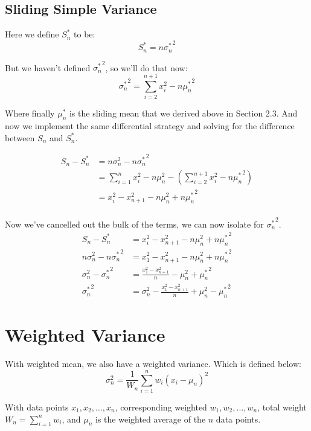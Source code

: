 \documentclass[english,12pt]{article}
\theoremstyle{plain}
\theoremstyle{definition}
\theoremstyle{definition} %
\newcommand{\brac}[1]{\left(#1\right)} %
\begin{document}
\subsection{Sliding Simple Variance}
Here we define $S_n^\ast$ to be:
\[S_n^\ast = n{\sigma_n^\ast}^2\]

But we haven't defined ${\sigma_n^\ast}^2$, so we'll do that now:
\[{\sigma_n^\ast}^2 = \sum_{i=2}^{n+1}x_i^2 - n{\mu_n^\ast}^2\]

Where finally $\mu_n^\ast$ is the sliding mean that we derived above in Section 2.3.  And now we implement  the same differential strategy and solving for the difference between $S_n$ and $S_n^\ast$.

\begin{align*}
S_n - S_n^\ast &= n\sigma_n^2 - n{\sigma_n^\ast}^2\\
&= \sum_{i=1}^nx_i^2 - n\mu_n^2 - \brac{\sum_{i=2}^{n+1}x_i^2 - n{\mu_n^\ast}^2}\\
&= x_i^2 - x_{n+1}^2 - n\mu_n^2 + n{\mu_n^\ast}^2\\
\end{align*}

Now we've cancelled out the bulk of the terms, we can now isolate for ${\sigma_n^\ast}^2$.
\begin{align*}
S_n - S_n^\ast &= x_i^2 - x_{n+1}^2 - n\mu_n^2 + n{\mu_n^\ast}^2\\
n\sigma_n^2 - n{\sigma_n^\ast}^2 &= x_1^2 - x_{n+1}^2 - n\mu_n^2 + n{\mu_n^\ast}^2\\
\sigma_n^2 - {\sigma_n^\ast}^2 &= \frac{x_1^2 - x_{n+1}^2}{n} - \mu_n^2 + {\mu_n^\ast}^2\\
{\sigma_n^\ast}^2 &= \sigma_n^2 - \frac{x_1^2 - x_{n+1}^2}{n} + \mu_n^2 - {\mu_n^\ast}^2
\end{align*}

\section{Weighted Variance}
With weighted mean, we also have a weighted variance.  Which is defined below:
\[\sigma_n^2 =\frac{1}{W_n}\sum_{i=1}^n w_i(x_i - \mu_n)^2\]

With data points $x_1,x_2,\ldots, x_n$, corresponding weighted $w_1,w_2,\ldots, w_n$, total weight $W_n = \sum_{i=1}^nw_i$, and $\mu_n$ is the weighted average of the $n$ data points.
\end{document}
